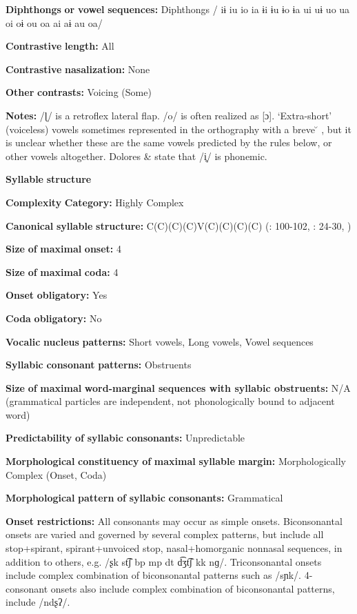 \textbf{Diphthongs} \textbf{or} \textbf{vowel} \textbf{sequences:} Diphthongs / iɨ iu io ia ɨi ɨu ɨo ɨa ui uɨ uo ua oi oɨ ou oa ai aɨ au oa/

\textbf{Contrastive} \textbf{length:} All

\textbf{Contrastive} \textbf{nasalization:} None

\textbf{Other} \textbf{contrasts:} Voicing (Some)

\textbf{Notes:} /ɭ/ is a retroflex lateral flap. /o/ is often realized as [ɔ]. ‘Extra-short’ (voiceless) vowels sometimes represented in the orthography with a breve  \u{} , but it is unclear whether these are the same vowels predicted by the rules below, or other vowels altogether. Dolores \& \citet[236]{Mathiot1991} state that /i̥/ is phonemic.

\textbf{Syllable} \textbf{structure}

\textbf{Complexity} \textbf{Category:} Highly Complex

\textbf{Canonical} \textbf{syllable} \textbf{structure:} C(C)(C)(C)V(C)(C)(C)(C) (\citealt{Saxton1982}: 100-102, \citealt{Hale1959}: 24-30, \citealt{HillZepeda1992})

\textbf{Size} \textbf{of} \textbf{maximal} \textbf{onset:} 4

\textbf{Size} \textbf{of} \textbf{maximal} \textbf{coda:} 4

\textbf{Onset} \textbf{obligatory:} Yes

\textbf{Coda} \textbf{obligatory:} No

\textbf{Vocalic} \textbf{nucleus} \textbf{patterns:} Short vowels, Long vowels, Vowel sequences

\textbf{Syllabic} \textbf{consonant} \textbf{patterns:} Obstruents

\textbf{Size} \textbf{of} \textbf{maximal} \textbf{word{}-marginal sequences with syllabic obstruents:} N/A (grammatical particles are independent, not phonologically bound to adjacent word)

\textbf{Predictability} \textbf{of} \textbf{syllabic} \textbf{consonants:} Unpredictable

\textbf{Morphological} \textbf{constituency} \textbf{of} \textbf{maximal} \textbf{syllable} \textbf{margin:} Morphologically Complex (Onset, Coda)

\textbf{Morphological} \textbf{pattern} \textbf{of} \textbf{syllabic} \textbf{consonants:} Grammatical

\textbf{Onset} \textbf{restrictions:} All consonants may occur as simple onsets. Biconsonantal onsets are varied and governed by several complex patterns, but include all stop+spirant, spirant+unvoiced stop, nasal+homorganic nonnasal sequences, in addition to others, e.g. /ʂk st͡ʃ bp mp dt d͡ʒt͡ʃ kk nɡ/. Triconsonantal onsets include complex combination of biconsonantal patterns such as /sɲk/. 4-consonant onsets also include complex combination of biconsonantal patterns, include /ndʂʔ/.

